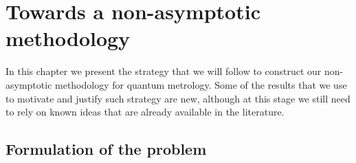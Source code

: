 \chapter{Towards a non-asymptotic methodology}
\label{chap:methodology}

In this chapter we present the strategy that we will follow to construct our non-asymptotic methodology for quantum metrology. Some of the results that we use to motivate and justify such strategy are new, although at this stage we still need to rely on known ideas that are already available in the literature.

\section{Formulation of the problem}
\label{sec:problem}

